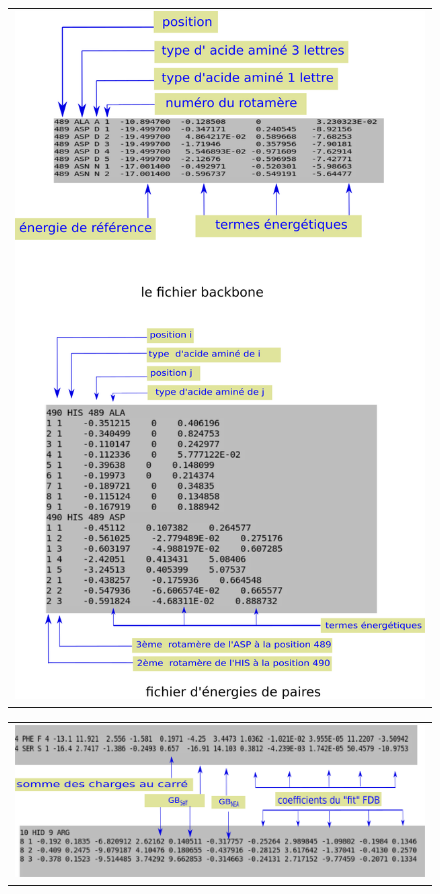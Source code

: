    \begin{figure}[!htbp]
     \centering
     \begin{tabular}{c}
       \includegraphics[width=11cm]{figure/inputener.png} 
     \end{tabular}     
     \caption{}
\label{fig:CAenerfile}
   \end{figure}

   \begin{figure}[!htbp]
     \centering
     \begin{tabular}{c}
       \includegraphics[width=13cm]{figure/inputenerGB.png} 
     \end{tabular}     
     \caption{}
\label{fig:GBenerfile}
   \end{figure}
   
